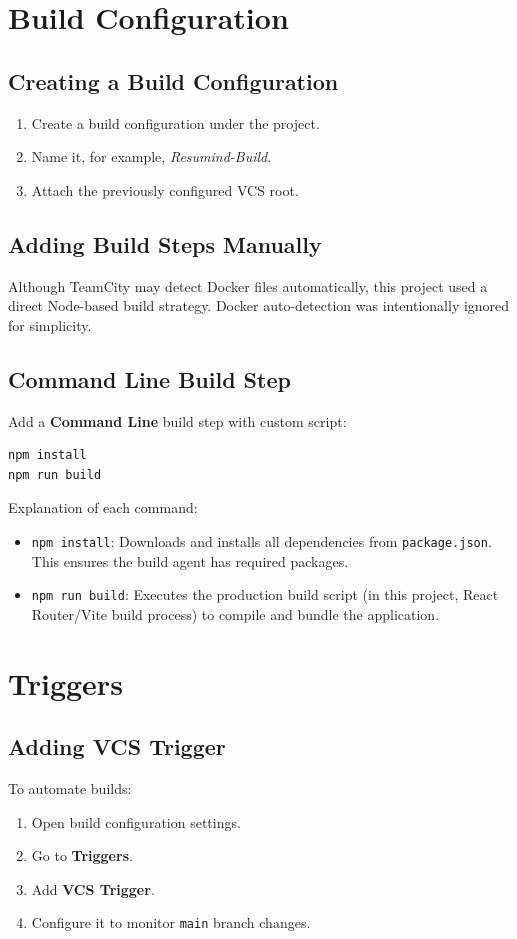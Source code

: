 \documentclass[12pt,a4paper]{report}
\begin{document}
\section{Build Configuration}
\subsection{Creating a Build Configuration}
\begin{enumerate}[leftmargin=1.2cm]
    \item Create a build configuration under the project.
    \item Name it, for example, \textit{Resumind-Build}.
    \item Attach the previously configured VCS root.
\end{enumerate}

\subsection{Adding Build Steps Manually}
Although TeamCity may detect Docker files automatically, this project used a direct Node-based build strategy. Docker auto-detection was intentionally ignored for simplicity.

\subsection{Command Line Build Step}
Add a \textbf{Command Line} build step with custom script:
\begin{lstlisting}[language=bash,caption={TeamCity Build Script}]
npm install
npm run build
\end{lstlisting}

Explanation of each command:
\begin{itemize}[leftmargin=1.2cm]
    \item \texttt{npm install}: Downloads and installs all dependencies from \texttt{package.json}. This ensures the build agent has required packages.
    \item \texttt{npm run build}: Executes the production build script (in this project, React Router/Vite build process) to compile and bundle the application.
\end{itemize}

\section{Triggers}
\subsection{Adding VCS Trigger}
To automate builds:
\begin{enumerate}[leftmargin=1.2cm]
    \item Open build configuration settings.
    \item Go to \textbf{Triggers}.
    \item Add \textbf{VCS Trigger}.
    \item Configure it to monitor \texttt{main} branch changes.
\end{enumerate}
\end{document}

